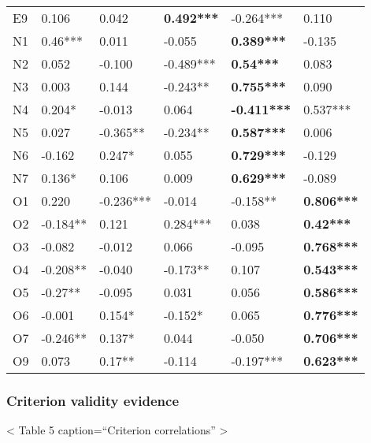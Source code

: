 \documentclass[man]{apa6}
\theoremstyle{definition}
\theoremstyle{definition}
\theoremstyle{definition}
\theoremstyle{remark}
\begin{document}
\begin{table}[ht]
\begin{tabular}{llllll}
  E9 & 0.106 & 0.042 & \textbf{0.492***} & -0.264*** & 0.110 \\ 
  N1 & 0.46*** & 0.011 & -0.055 & \textbf{0.389***} & -0.135 \\ 
  N2 & 0.052 & -0.100 & -0.489*** & \textbf{0.54***} & 0.083 \\ 
  N3 & 0.003 & 0.144 & -0.243** & \textbf{0.755***} & 0.090 \\ 
  N4 & 0.204* & -0.013 & 0.064 & \textbf{-0.411***} & 0.537*** \\ 
  N5 & 0.027 & -0.365** & -0.234** & \textbf{0.587***} & 0.006 \\ 
  N6 & -0.162 & 0.247* & 0.055 & \textbf{0.729***} & -0.129 \\ 
  N7 & 0.136* & 0.106 & 0.009 & \textbf{0.629***} & -0.089 \\ 
  O1 & 0.220 & -0.236*** & -0.014 & -0.158** & \textbf{0.806***} \\ 
  O2 & -0.184** & 0.121 & 0.284*** & 0.038 & \textbf{0.42***} \\ 
  O3 & -0.082 & -0.012 & 0.066 & -0.095 & \textbf{0.768***} \\ 
  O4 & -0.208** & -0.040 & -0.173** & 0.107 & \textbf{0.543***} \\ 
  O5 & -0.27** & -0.095 & 0.031 & 0.056 & \textbf{0.586***} \\ 
  O6 & -0.001 & 0.154* & -0.152* & 0.065 & \textbf{0.776***} \\ 
  O7 & -0.246** & 0.137* & 0.044 & -0.050 & \textbf{0.706***} \\ 
  O9 & 0.073 & 0.17** & -0.114 & -0.197*** & \textbf{0.623***} \\ 
   \hline
\end{tabular}
\endgroup
\end{table}

\hypertarget{criterion-validity-evidence-1}{%
\subsubsection{Criterion validity
evidence}\label{criterion-validity-evidence-1}}

\textless{} Table 5 caption=\enquote{Criterion correlations}
\textgreater{}
\end{document}
